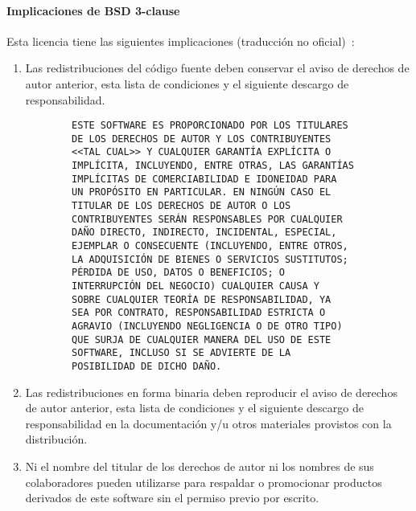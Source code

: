 \paragraph{Implicaciones de BSD 3-clause} Esta licencia tiene las siguientes implicaciones
(traducción no oficial)~\cite{bsd}:
\begin{enumerate}
    \item Las redistribuciones del código fuente deben conservar el aviso de
    derechos de autor anterior, esta lista de condiciones y el siguiente
    descargo de responsabilidad.
    \begin{verbatim}
        ESTE SOFTWARE ES PROPORCIONADO POR LOS TITULARES 
        DE LOS DERECHOS DE AUTOR Y LOS CONTRIBUYENTES 
        <<TAL CUAL>> Y CUALQUIER GARANTÍA EXPLÍCITA O
        IMPLÍCITA, INCLUYENDO, ENTRE OTRAS, LAS GARANTÍAS
        IMPLÍCITAS DE COMERCIABILIDAD E IDONEIDAD PARA 
        UN PROPÓSITO EN PARTICULAR. EN NINGÚN CASO EL 
        TITULAR DE LOS DERECHOS DE AUTOR O LOS 
        CONTRIBUYENTES SERÁN RESPONSABLES POR CUALQUIER 
        DAÑO DIRECTO, INDIRECTO, INCIDENTAL, ESPECIAL, 
        EJEMPLAR O CONSECUENTE (INCLUYENDO, ENTRE OTROS, 
        LA ADQUISICIÓN DE BIENES O SERVICIOS SUSTITUTOS;
        PÉRDIDA DE USO, DATOS O BENEFICIOS; O 
        INTERRUPCIÓN DEL NEGOCIO) CUALQUIER CAUSA Y 
        SOBRE CUALQUIER TEORÍA DE RESPONSABILIDAD, YA 
        SEA POR CONTRATO, RESPONSABILIDAD ESTRICTA O 
        AGRAVIO (INCLUYENDO NEGLIGENCIA O DE OTRO TIPO)
        QUE SURJA DE CUALQUIER MANERA DEL USO DE ESTE 
        SOFTWARE, INCLUSO SI SE ADVIERTE DE LA 
        POSIBILIDAD DE DICHO DAÑO.
    \end{verbatim}
    \item Las redistribuciones en forma binaria deben reproducir el aviso de
    derechos de autor anterior, esta lista de condiciones y el siguiente
    descargo de responsabilidad en la documentación y/u otros materiales
    provistos con la distribución.
    \item Ni el nombre del titular de los derechos de autor ni los nombres de
    sus colaboradores pueden utilizarse para respaldar o promocionar productos
    derivados de este software sin el permiso previo por escrito.
\end{enumerate}
